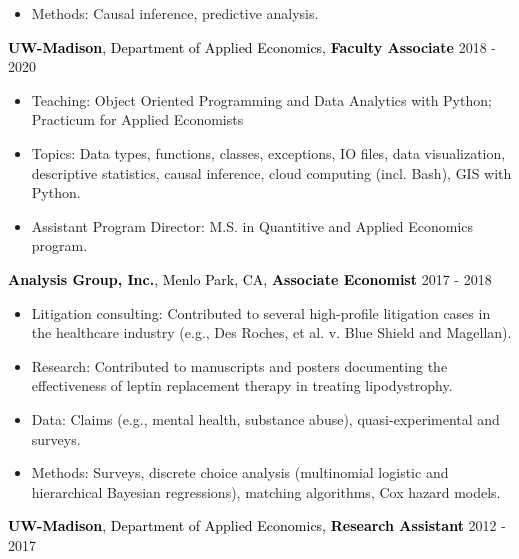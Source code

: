 \documentclass[margin,line]{res}                          %
\newenvironment{list1}{
  \begin{list}{\ding{113}}{%
      \setlength{\itemsep}{0in}
      \setlength{\parsep}{0in} \setlength{\parskip}{0in}
      \setlength{\topsep}{0in} \setlength{\partopsep}{0in} 
      \setlength{\leftmargin}{0.17in}}}{\end{list}}
\begin{document}
\begin{resume}
\begin{list1}
\begin{itemize}
\item Methods: Causal inference, predictive analysis.


\end{itemize}
\item[]


\item[] \textcolor{Black}{\textbf{UW-Madison}, Department of Applied Economics, \textbf{Faculty Associate}}  \hspace{2.0cm}2018 - 2020
\begin{itemize}
\item Teaching: Object Oriented Programming and Data Analytics with Python; Practicum for Applied Economists
\item Topics: Data types, functions, classes, exceptions, IO files, data visualization, descriptive statistics, causal inference, cloud computing (incl. Bash), GIS with Python.
\item Assistant Program Director: M.S. in Quantitive and Applied Economics program.
\end{itemize}
\item[]


\item[] \textcolor{Black}{\textbf{Analysis Group, Inc.}, Menlo Park, CA, \textbf{Associate Economist}} \hspace{2.8 cm} 2017 - 2018
\begin{itemize}
\item Litigation consulting: Contributed to several high-profile litigation cases in the healthcare industry (e.g., Des Roches, et al. v. Blue Shield and Magellan).
\item Research: Contributed to manuscripts and posters documenting the effectiveness of leptin replacement therapy in treating lipodystrophy.
\item Data: Claims (e.g., mental health, substance abuse), quasi-experimental and surveys.
\item Methods: Surveys, discrete choice analysis (multinomial logistic and hierarchical Bayesian regressions), matching algorithms, Cox hazard models.
\end{itemize}
\item[]

\item[] \textcolor{Black}{\textbf{UW-Madison}, Department of Applied Economics, \textbf{Research Assistant}} \hspace{1.703cm} 2012 - 2017
\item[]



\end{list1}
\end{resume}
\end{document}
